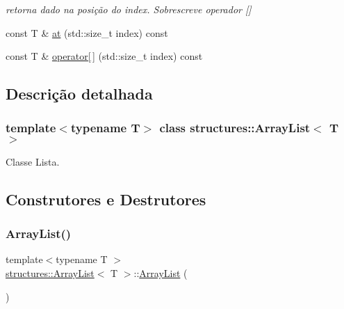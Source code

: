 \begin{DoxyCompactItemize}
\begin{DoxyCompactList}\small\item\em retorna dado na posição do index. Sobrescreve operador \mbox{[}\mbox{]} \end{DoxyCompactList}\item 
const T \& \mbox{\hyperlink{classstructures_1_1ArrayList_a0906cf7f36a593688704135a8201543f}{at}} (std\+::size\+\_\+t index) const
\item 
const T \& \mbox{\hyperlink{classstructures_1_1ArrayList_a14f95d5eba667fdbb3d826f71a16fc5c}{operator\mbox{[}$\,$\mbox{]}}} (std\+::size\+\_\+t index) const
\end{DoxyCompactItemize}


\subsection{Descrição detalhada}
\subsubsection*{template$<$typename T$>$\newline
class structures\+::\+Array\+List$<$ T $>$}

Classe Lista. 

\subsection{Construtores e Destrutores}
\mbox{\label{classstructures_1_1ArrayList_a1fab93fc7adb5e4825f51dda6d4a0266}} 
\subsubsection{\texorpdfstring{ArrayList()}{ArrayList()}\hspace{0.1cm}{\footnotesize\ttfamily [1/2]}}
{\footnotesize\ttfamily template$<$typename T $>$ \\
\mbox{\hyperlink{classstructures_1_1ArrayList}{structures\+::\+Array\+List}}$<$ T $>$\+::\mbox{\hyperlink{classstructures_1_1ArrayList}{Array\+List}} (\begin{DoxyParamCaption}{ }\end{DoxyParamCaption})}



